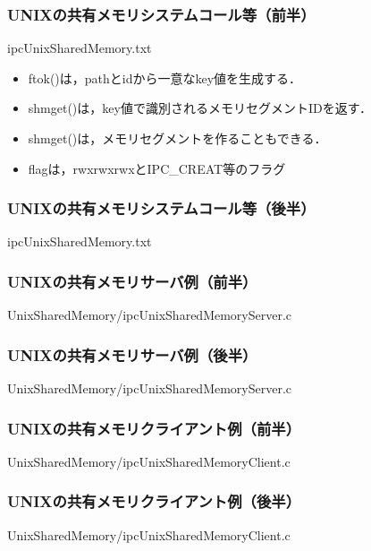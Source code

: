 \documentclass[unicode,handout]{beamer}                   %
\begin{document}
\begin{frame}
  \frametitle{UNIXの共有メモリシステムコール等（前半）}
      {ipcUnixSharedMemory.txt}
  \begin{itemize}
  \item ftok()は，pathとidから一意なkey値を生成する．
  \item shmget()は，key値で識別されるメモリセグメントIDを返す．
  \item shmget()は，メモリセグメントを作ることもできる．
  \item flagは，rwxrwxrwxとIPC\_CREAT等のフラグ
  \end{itemize}
\end{frame}

\begin{frame}
  \frametitle{UNIXの共有メモリシステムコール等（後半）}
      {ipcUnixSharedMemory.txt}
\end{frame}

\begin{frame}
  \frametitle{UNIXの共有メモリサーバ例（前半）}
      {UnixSharedMemory/ipcUnixSharedMemoryServer.c}
\end{frame}

\begin{frame}
  \frametitle{UNIXの共有メモリサーバ例（後半）}
      {UnixSharedMemory/ipcUnixSharedMemoryServer.c}
\end{frame}

\begin{frame}
  \frametitle{UNIXの共有メモリクライアント例（前半）}
      {UnixSharedMemory/ipcUnixSharedMemoryClient.c}
\end{frame}

\begin{frame}
  \frametitle{UNIXの共有メモリクライアント例（後半）}
      {UnixSharedMemory/ipcUnixSharedMemoryClient.c}
\end{frame}
\end{document}

